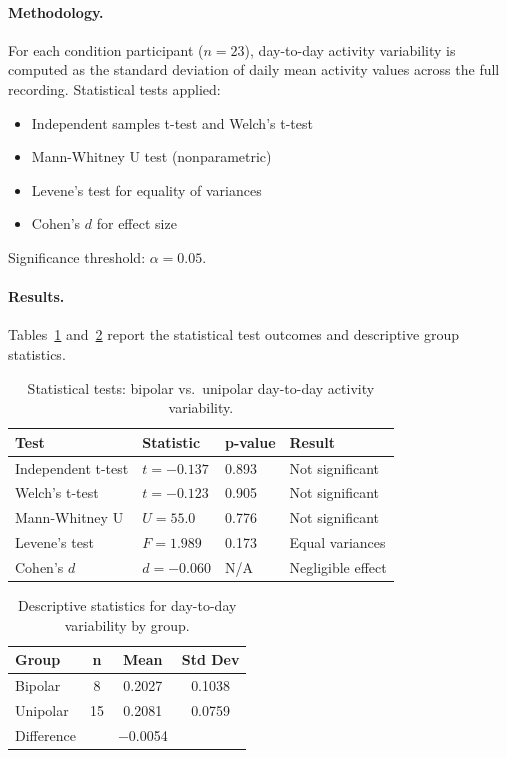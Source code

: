 \paragraph{Methodology.}
For each condition participant ($n = 23$), day-to-day activity variability is computed as the standard deviation of daily mean activity values across the full recording. Statistical tests applied:
\begin{itemize}[nosep]
  \item Independent samples t-test and Welch's t-test
  \item Mann-Whitney U test (nonparametric) \cite{mann1947test}
  \item Levene's test for equality of variances
  \item Cohen's $d$ for effect size \cite{cohen1988statistical}
\end{itemize}
Significance threshold: $\alpha = 0.05$.

\paragraph{Results.}
Tables~\ref{tab:approach3_3a_stats} and~\ref{tab:approach3_3a_groups} report the statistical test outcomes and descriptive group statistics.

\begin{table}[H]
\centering
\caption{Statistical tests: bipolar vs.\ unipolar day-to-day activity variability.}
\label{tab:approach3_3a_stats}
\begin{tabular}{llll}
\toprule
\textbf{Test} & \textbf{Statistic} & \textbf{p-value} & \textbf{Result} \\
\midrule
Independent t-test & $t = {-}0.137$ & 0.893 & Not significant \\
Welch's t-test & $t = {-}0.123$ & 0.905 & Not significant \\
Mann-Whitney U & $U = 55.0$ & 0.776 & Not significant \\
Levene's test & $F = 1.989$ & 0.173 & Equal variances \\
Cohen's $d$ & $d = {-}0.060$ & N/A & Negligible effect \\
\bottomrule
\end{tabular}
\end{table}

\begin{table}[H]
\centering
\caption{Descriptive statistics for day-to-day variability by group.}
\label{tab:approach3_3a_groups}
\begin{tabular}{lccc}
\toprule
\textbf{Group} & \textbf{n} & \textbf{Mean} & \textbf{Std Dev} \\
\midrule
Bipolar & 8 & 0.2027 & 0.1038 \\
Unipolar & 15 & 0.2081 & 0.0759 \\
Difference & & $-$0.0054 & \\
\bottomrule
\end{tabular}
\end{table}

